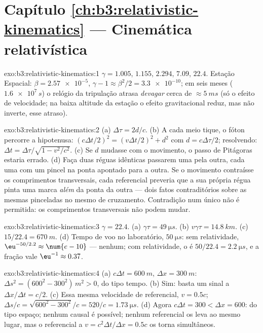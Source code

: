 \section*{Capítulo \ref{ch:b3:relativistic-kinematics} --- Cinemática relativística}

\begin{solution}{exo:b3:relativistic-kinematics:1}
$\gamma = 1.005$, $1.155$, $2.294$, $7.09$, $22.4$. Estação Espacial: $\beta =
\num{2.57e-5}$, $\gamma - 1 \approx \beta^2/2 = \num{3.3e-10}$;
em seis meses ($\num{1.6e7}{}\,\unit{s}$) o relógio da tripulação
atrasa \emph{devagar} cerca de $\approx\qty{5}{ms}$ (só o efeito de
velocidade; na baixa altitude da estação o efeito gravitacional reduz,
mas não inverte, esse atraso).
\end{solution}

\begin{solution}{exo:b3:relativistic-kinematics:2}
(a) $\Delta\tau = 2d/c$. (b) A cada meio tique, o fóton percorre a
hipotenusa: $(c\Delta t/2)^2 = (v\Delta t/2)^2 + d^2$ com $d =
c\Delta\tau/2$; resolvendo: $\Delta t = \Delta\tau/\sqrt{1 - v^2/c^2}$.
(c) Se $d$ mudasse com o movimento, o passo de Pitágoras estaria
errado. (d) Faça duas réguas idênticas passarem uma pela outra, cada
uma com um pincel na ponta apontado para a outra. Se o movimento
contraísse os comprimentos transversais, cada referencial preveria que
a sua própria régua pinta uma marca \emph{além} da ponta da outra ---
dois fatos contraditórios sobre as mesmas pinceladas no mesmo  de
cruzamento. Contradição num único  não é permitida: os
comprimentos transversais não podem mudar.
\end{solution}

\begin{solution}{exo:b3:relativistic-kinematics:3}
$\gamma = 22.4$. (a) $\gamma\tau = \qty{49}{\micro s}$. (b) $v\gamma
\tau = \qty{14.8}{km}$. (c) $15/22.4 = \qty{670}{m}$. (d) Tempo de voo
no laboratório, $\qty{50}{\micro s}$: sem relatividade,
$\eu^{-50/2.2} \approx \num{e-10}$ --- nenhum; com relatividade, o
 é $50/22.4 = \qty{2.2}{\micro s}$, e a fração vale $\eu^{-1}
\approx 0.37$.
\end{solution}

\begin{solution}{exo:b3:relativistic-kinematics:4}
(a) $c\Delta t = \qty{600}{m}$, $\Delta x = \qty{300}{m}$: $\Delta s^2
= (600^2 - 300^2)\,\unit{m^2} > 0$, do tipo tempo. (b) Sim: basta um
sinal a $\Delta x/\Delta t = c/2$. (c) Essa mesma velocidade de
referencial, $v =
0.5c$;  $\Delta s/c = \sqrt{600^2 - 300^2}/c = 520/c =
\qty{1.73}{\micro s}$. (d) Agora $c\Delta t = 300 < \Delta x = 600$: do
tipo espaço; nenhum  causal é possível; nenhum referencial os
leva ao mesmo lugar, mas o referencial a $v = c^2\Delta t/\Delta x = 0.5c$
os torna simultâneos.
\end{solution}

